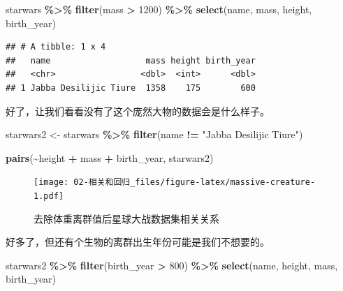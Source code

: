 \documentclass[
]{book}
\newenvironment{Shaded}{\begin{snugshade}}{\end{snugshade}}
\newcommand{\DecValTok}[1]{\textcolor[rgb]{0.00,0.00,0.81}{#1}}
\newcommand{\FunctionTok}[1]{\textcolor[rgb]{0.13,0.29,0.53}{\textbf{#1}}}
\newcommand{\NormalTok}[1]{#1}
\newcommand{\OtherTok}[1]{\textcolor[rgb]{0.56,0.35,0.01}{#1}}
\newcommand{\SpecialCharTok}[1]{\textcolor[rgb]{0.81,0.36,0.00}{\textbf{#1}}}
\newcommand{\StringTok}[1]{\textcolor[rgb]{0.31,0.60,0.02}{#1}}
\begin{document}
\begin{Shaded}
\begin{Highlighting}[]
\NormalTok{starwars }\SpecialCharTok{\%\textgreater{}\%}
  \FunctionTok{filter}\NormalTok{(mass }\SpecialCharTok{\textgreater{}} \DecValTok{1200}\NormalTok{) }\SpecialCharTok{\%\textgreater{}\%}
  \FunctionTok{select}\NormalTok{(name, mass, height, birth\_year)}
\end{Highlighting}
\end{Shaded}

\begin{verbatim}
## # A tibble: 1 x 4
##   name                   mass height birth_year
##   <chr>                 <dbl>  <int>      <dbl>
## 1 Jabba Desilijic Tiure  1358    175        600
\end{verbatim}

好了，让我们看看没有了这个庞然大物的数据会是什么样子。

\begin{Shaded}
\begin{Highlighting}[]
\NormalTok{starwars2 }\OtherTok{\textless{}{-}}\NormalTok{ starwars }\SpecialCharTok{\%\textgreater{}\%}
  \FunctionTok{filter}\NormalTok{(name }\SpecialCharTok{!=} \StringTok{"Jabba Desilijic Tiure"}\NormalTok{)}

\FunctionTok{pairs}\NormalTok{(}\SpecialCharTok{\textasciitilde{}}\NormalTok{height }\SpecialCharTok{+}\NormalTok{ mass }\SpecialCharTok{+}\NormalTok{ birth\_year, starwars2)}
\end{Highlighting}
\end{Shaded}

\begin{figure}
\centering
\texttt{[image: 02-相关和回归\_files/figure-latex/massive-creature-1.pdf]}
\caption{\label{fig:massive-creature}去除体重离群值后星球大战数据集相关关系}
\end{figure}

好多了，但还有个生物的离群出生年份可能是我们不想要的。

\begin{Shaded}
\begin{Highlighting}[]
\NormalTok{starwars2 }\SpecialCharTok{\%\textgreater{}\%}
  \FunctionTok{filter}\NormalTok{(birth\_year }\SpecialCharTok{\textgreater{}} \DecValTok{800}\NormalTok{) }\SpecialCharTok{\%\textgreater{}\%}
  \FunctionTok{select}\NormalTok{(name, height, mass, birth\_year)}
\end{Highlighting}
\end{Shaded}
\end{document}
